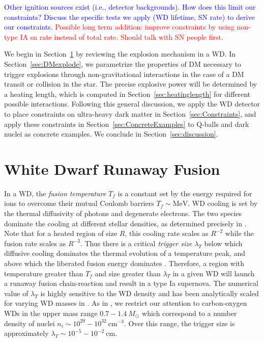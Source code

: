 \documentclass[twocolumn,showpacs,preprintnumbers,amsmath,amssymb,prd]{revtex4}
\newcommand{\MeV}{\text{MeV}}
\newcommand{\cm}{\text{cm}}
\begin{document}
\textcolor{blue}{Other ignition sources exist (i.e., detector backgrounds). How does this limit our constraints? Discuss the specific tests we apply (WD lifetime, SN rate) to derive our constraints.} \textcolor{red}{Possible long term addition: improve constraints by using non-type IA sn rate instead of total rate. Should talk with SN people first.}

We begin in Section~\ref{sec:review} by reviewing the explosion mechanism in a WD. In Section~\ref{sec:DMexplode}, we parametrize the properties of DM necessary to trigger explosions through non-gravitational interactions in the case of a DM transit or collision in the star. The precise explosive power will be determined by a heating length, which is computed in Section~\ref{sec:heatinglength} for different possible interactions. Following this general discussion, we apply the WD detector to place constraints on ultra-heavy dark matter in Section~\ref{sec:Constraints}, and apply these constraints in Section~\ref{sec:ConcreteExamples} to Q-balls and dark nuclei as concrete examples. We conclude in Section~\ref{sec:discussion}.

\section{White Dwarf Runaway Fusion}
\label{sec:review}
In a WD, the \emph{fusion temperature} $T_f$ is a constant set by the energy required for ions to overcome their mutual Coulomb barriers $T_f \sim \MeV$. WD cooling is set by the thermal diffusivity of photons and degenerate electrons. The two species dominate the cooling at different stellar densities, as determined precisely in \cite{Woosley}. Note that for a heated region of size $R$, this cooling rate scales as $R^{-2}$ while the fusion rate scales as $R^{-3}$. Thus there is a critical \emph{trigger size} $\lambda_T$ below which diffusive cooling dominates the thermal evolution of a temperature peak, and above which the liberated fusion energy dominates \cite{Woosley}. Therefore, a region with temperature greater than $T_f$ and size greater than $\lambda_T$ in a given WD will launch a runaway fusion chain-reaction and result in a type Ia supernova. The numerical value of $\lambda_T$ is highly sensitive to the WD density and has been analytically scaled for varying WD masses in \cite{Graham:2015apa}. As in \cite{Graham:2015apa}, we restrict our attention to carbon-oxygen WDs in the upper mass range $0.7 - 1.4 ~M_{\odot}$ which correspond to a number density of nuclei $n_i \sim 10^{29} - 10^{32} ~\cm^{-3}$. Over this range, the trigger size is approximately $\lambda_T \sim 10^{-5} - 10^{-2} ~\text{cm}$.
\end{document}

